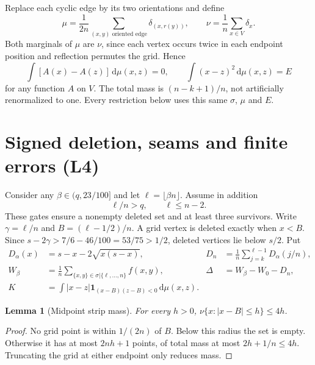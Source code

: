 \documentclass[11pt,a4paper]{article}
\newtheorem{lemma}[theorem]{Lemma}
\theoremstyle{remark}\newtheorem{remark}[theorem]{Remark}
\newcommand{\ind}{\mathbf 1}
\newcommand{\dd}{\,\mathrm d}
\begin{document}
Replace each cyclic edge by its two orientations and define
\begin{equation}\label{eq:measure}
\mu=\frac1{2n}\sum_{(x,y)\text{ oriented edge}}\delta_{(x,r(y))},
\qquad \nu=\frac1n\sum_{x\in V}\delta_x.
\end{equation}
Both marginals of $\mu$ are $\nu$, since each vertex occurs twice in
each endpoint position and reflection permutes the grid. Hence
\begin{equation}\label{eq:marginals}
\int[A(x)-A(z)]\dd\mu(x,z)=0,\qquad
\int(x-z)^2\dd\mu(x,z)=E
\end{equation}
for any function $A$ on $V$. The total mass is $(n-k+1)/n$, not
artificially renormalized to one. Every restriction below uses this
same $\sigma$, $\mu$ and $E$.

\section{Signed deletion, seams and finite errors (L4)}\label{sec:deletion}
Consider any $\beta\in(q,23/100]$ and let
$\ell=\lfloor\beta n\rfloor$. Assume in addition
\begin{equation}\label{eq:cutgate}
\ell/n>q,\qquad \ell\le n-2.
\end{equation}
These gates ensure a nonempty deleted set and at least three survivors.
Write $\gamma=\ell/n$ and $B=(\ell-1/2)/n$. A grid vertex is deleted
exactly when $x<B$. Since
$s-2\gamma>7/6-46/100=53/75>1/2$, deleted vertices lie below $s/2$.
Put
\begin{align*}
D_\alpha(x)&=s-x-2\sqrt{x(s-x)},&
D_n&=\frac1n\sum_{j=k}^{\ell-1}D_\alpha(j/n),\\
W_\beta&=\frac1n\sum_{\{x,y\}\in\sigma|\{\ell,\ldots,n\}}f(x,y),&
\Delta&=W_\beta-W_0-D_n,\\
K&=\int |x-z|\ind_{(x-B)(z-B)<0}\dd\mu(x,z).
\end{align*}

\begin{lemma}[Midpoint strip mass]\label{lem:strip}
For every $h>0$, $\nu\{x:|x-B|\le h\}\le4h$.
\end{lemma}
\begin{proof}
No grid point is within $1/(2n)$ of $B$. Below this radius the set is
empty. Otherwise it has at most $2nh+1$ points, of total mass at most
$2h+1/n\le4h$. Truncating the grid at either endpoint only reduces mass.
\end{proof}
\end{document}
